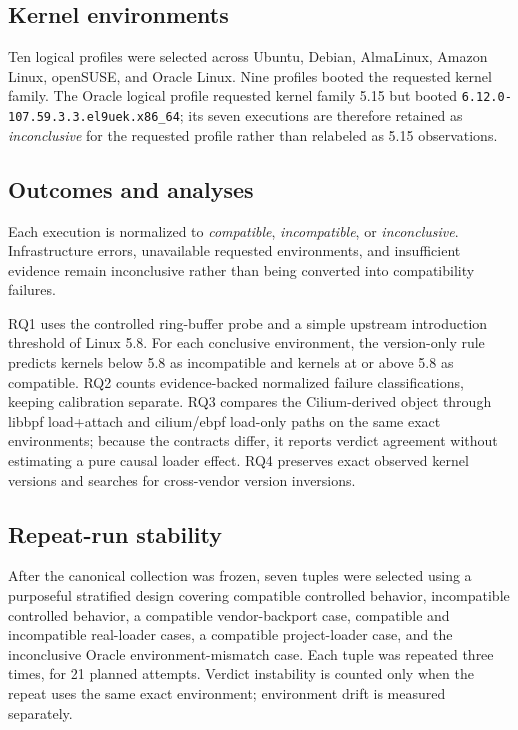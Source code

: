 \documentclass[10pt]{article}
\newcommand{\code}[1]{\texttt{#1}}
\begin{document}
\subsection{Kernel environments}
Ten logical profiles were selected across Ubuntu, Debian, AlmaLinux, Amazon Linux, openSUSE, and Oracle Linux. Nine profiles booted the requested kernel family. The Oracle logical profile requested kernel family 5.15 but booted \code{6.12.0-107.59.3.3.el9uek.x86\_64}; its seven executions are therefore retained as \emph{inconclusive} for the requested profile rather than relabeled as 5.15 observations.

\subsection{Outcomes and analyses}
Each execution is normalized to \emph{compatible}, \emph{incompatible}, or \emph{inconclusive}. Infrastructure errors, unavailable requested environments, and insufficient evidence remain inconclusive rather than being converted into compatibility failures.

RQ1 uses the controlled ring-buffer probe and a simple upstream introduction threshold of Linux 5.8. For each conclusive environment, the version-only rule predicts kernels below 5.8 as incompatible and kernels at or above 5.8 as compatible. RQ2 counts evidence-backed normalized failure classifications, keeping calibration separate. RQ3 compares the Cilium-derived object through libbpf load+attach and cilium/ebpf load-only paths on the same exact environments; because the contracts differ, it reports verdict agreement without estimating a pure causal loader effect. RQ4 preserves exact observed kernel versions and searches for cross-vendor version inversions.

\subsection{Repeat-run stability}
After the canonical collection was frozen, seven tuples were selected using a purposeful stratified design covering compatible controlled behavior, incompatible controlled behavior, a compatible vendor-backport case, compatible and incompatible real-loader cases, a compatible project-loader case, and the inconclusive Oracle environment-mismatch case. Each tuple was repeated three times, for 21 planned attempts. Verdict instability is counted only when the repeat uses the same exact environment; environment drift is measured separately.
\end{document}
